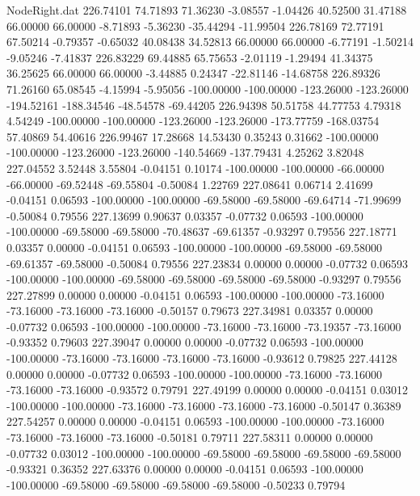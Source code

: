 \begin{filecontents}{NodeRight.dat}
 226.74101   74.71893   71.36230    -3.08557   -1.04426   40.52500   31.47188   66.00000   66.00000   -8.71893   -5.36230  -35.44294  -11.99504
 226.78169   72.77191   67.50214    -0.79357   -0.65032   40.08438   34.52813   66.00000   66.00000   -6.77191   -1.50214   -9.05246   -7.41837
 226.83229   69.44885   65.75653    -2.01119   -1.29494   41.34375   36.25625   66.00000   66.00000   -3.44885    0.24347  -22.81146  -14.68758
 226.89326   71.26160   65.08545    -4.15994   -5.95056 -100.00000 -100.00000 -123.26000 -123.26000 -194.52161 -188.34546  -48.54578  -69.44205
 226.94398   50.51758   44.77753     4.79318    4.54249 -100.00000 -100.00000 -123.26000 -123.26000 -173.77759 -168.03754   57.40869   54.40616
 226.99467   17.28668   14.53430     0.35243    0.31662 -100.00000 -100.00000 -123.26000 -123.26000 -140.54669 -137.79431    4.25262    3.82048
 227.04552    3.52448    3.55804    -0.04151    0.10174 -100.00000 -100.00000  -66.00000  -66.00000  -69.52448  -69.55804   -0.50084    1.22769
 227.08641    0.06714    2.41699    -0.04151    0.06593 -100.00000 -100.00000  -69.58000  -69.58000  -69.64714  -71.99699   -0.50084    0.79556
 227.13699    0.90637    0.03357    -0.07732    0.06593 -100.00000 -100.00000  -69.58000  -69.58000  -70.48637  -69.61357   -0.93297    0.79556
 227.18771    0.03357    0.00000    -0.04151    0.06593 -100.00000 -100.00000  -69.58000  -69.58000  -69.61357  -69.58000   -0.50084    0.79556
 227.23834    0.00000    0.00000    -0.07732    0.06593 -100.00000 -100.00000  -69.58000  -69.58000  -69.58000  -69.58000   -0.93297    0.79556
 227.27899    0.00000    0.00000    -0.04151    0.06593 -100.00000 -100.00000  -73.16000  -73.16000  -73.16000  -73.16000   -0.50157    0.79673
 227.34981    0.03357    0.00000    -0.07732    0.06593 -100.00000 -100.00000  -73.16000  -73.16000  -73.19357  -73.16000   -0.93352    0.79603
 227.39047    0.00000    0.00000    -0.07732    0.06593 -100.00000 -100.00000  -73.16000  -73.16000  -73.16000  -73.16000   -0.93612    0.79825
 227.44128    0.00000    0.00000    -0.07732    0.06593 -100.00000 -100.00000  -73.16000  -73.16000  -73.16000  -73.16000   -0.93572    0.79791
 227.49199    0.00000    0.00000    -0.04151    0.03012 -100.00000 -100.00000  -73.16000  -73.16000  -73.16000  -73.16000   -0.50147    0.36389
 227.54257    0.00000    0.00000    -0.04151    0.06593 -100.00000 -100.00000  -73.16000  -73.16000  -73.16000  -73.16000   -0.50181    0.79711
 227.58311    0.00000    0.00000    -0.07732    0.03012 -100.00000 -100.00000  -69.58000  -69.58000  -69.58000  -69.58000   -0.93321    0.36352
 227.63376    0.00000    0.00000    -0.04151    0.06593 -100.00000 -100.00000  -69.58000  -69.58000  -69.58000  -69.58000   -0.50233    0.79794

\end{filecontents}
